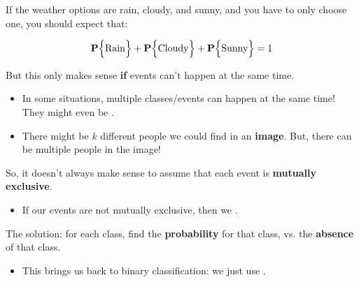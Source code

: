             \miniex If the weather options are rain, cloudy, and sunny, and you have to only choose one, you should expect that:

            \begin{equation}
                \mathbf{P} \Bigl\{\text{Rain}\Bigr\} + \mathbf{P} \Bigl\{\text{Cloudy}\Bigr\} + \mathbf{P} \Bigl\{\text{Sunny}\Bigr\} = 1
            \end{equation}

            \subsecdiv

            But this only makes sense \textbf{if} events can't happen at the same time.

            \begin{itemize}
                \item In some situations, multiple classes/events can happen at the same time! They might even be .
                \item \miniex There might be $k$ different people we could find in an \textbf{image}. But, there can be multiple people in the  image! 
            \end{itemize}
            

            So, it doesn't always make sense to assume that each event is \textbf{mutually exclusive}.

            \begin{itemize}
                \item If our events are not mutually exclusive, then we .
            \end{itemize}

            The solution: for each class, find the \textbf{probability} for that class, vs. the \textbf{absence} of that class.

            \begin{itemize}
                \item This brings us back to binary classification: we just use .\\
            \end{itemize}
            
